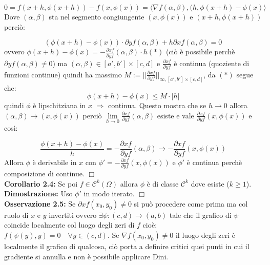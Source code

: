 \documentclass[a4paper,11pt,titlepage]{book}
\begin{document}
$$0=f(x+h,\phi(x+h))-f(x,\phi(x))=\langle \nabla f(\alpha,\beta),(h,\phi(x+h)-\phi(x)\rangle$$ Dove $(\alpha,\beta)$ sta nel segmento congiungente $(x,\phi(x))$ e $(x+h,\phi(x+h))$ perciò: 

$$(\phi(x+h)-\phi(x))\cdot\partial y f(\alpha,\beta)+h\partial x f(\alpha,\beta)=0$$ 
ovvero $\phi(x+h)-\phi(x)=-\frac{\partial x f}{\partial y f}(\alpha,\beta)\cdot h (*)$ (ciò è possibile perchè $\partial y f(\alpha,\beta)\ne 0$) ma $(\alpha,\beta)\in[a',b']\times[c,d]$ e $\frac{\partial x f}{\partial y f}$ è continua (quoziente di funzioni continue) quindi ha massimo $M:=||\frac{\partial x f}{\partial y f}||_{\infty,[a',b']\times[c,d]}$, da $(*)$ segue che: $$\phi(x+h)-\phi(x)\leq M\cdot |h|$$
quindi $\phi$ è lipschitziana in $x$ $\Rightarrow$ continua. Questo mostra che se $h\to 0$ allora $(\alpha,\beta)\to(x,\phi(x))$ perciò $\lim\limits_{h\to 0}\frac{\partial x f}{\partial y f}(\alpha,\beta)$ esiste e vale $\frac{\partial x f}{\partial y f}(x,\phi(x))$ e così: 

$$\frac{\phi(x+h)-\phi(x)}{h}=-\frac{\partial x f}{\partial y f}(\alpha,\beta)\to -\frac{\partial x f}{\partial y f}(x,\phi(x))$$
 Allora $\phi$ è derivabile in $x$ con $\phi '=-\frac{\partial x f}{\partial y f}(x,\phi(x))$ e $\phi '$ è continua perchè composizione di continue. $\Box$\\

\textbf{Corollario 2.4:} Se poi $f\in\mathcal{C}^k(\Omega)$ allora $\phi$ è di classe $\mathcal{C}^k$ dove esiste ($k\geq 1$).\\

\textbf{Dimostrazione:} Uso $\phi '$ in modo iterato. $\Box$ \\

\textbf{Osservazione 2.5:} Se $\partial x f(x_0,y_0)\ne 0$ si può procedere come prima ma col ruolo di $x$ e $y$ invertiti ovvero $\exists\psi:(c,d)\to(a,b)$ tale che il grafico di $\psi$ coincide localmente col luogo degli zeri di $f$ cioè: $f(\psi(y),y)=0\quad\forall y\in (c,d)$. Se $\nabla f(x_0,y_0)\ne 0$ il luogo degli zeri è localmente il grafico di qualcosa, ciò porta a definire critici quei punti in cui il gradiente si annulla e non è possibile applicare Dini.\\
\end{document}
